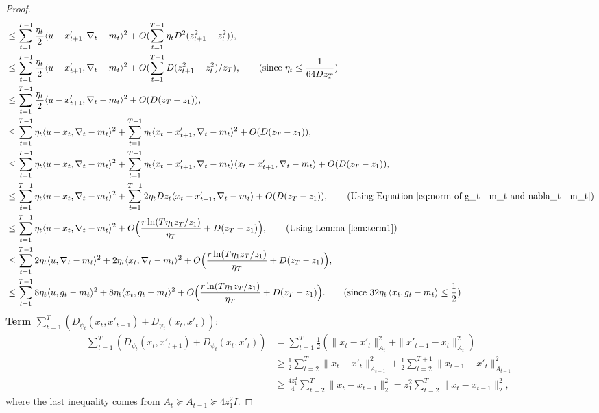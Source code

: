 \documentclass{article}
\theoremstyle{plain}
\theoremstyle{definition}
\theoremstyle{remark}
\newcommand{\inner}[2]{\left\langle #1, #2 \right\rangle}
\begin{document}
\begin{proof}
\begin{align*}
&\leq \sum_{t=1}^{T-1} \frac{\eta_t}{2}\langle u-x'_{t+1},\nabla_t-m_t\rangle^2+O(\sum_{t=1}^{T-1}\eta_t D^2(z_{t+1}^2-z_t^2)),\\
& \leq \sum_{t=1}^{T-1} \frac{\eta_t}{2}\langle u-x'_{t+1},\nabla_t-m_t\rangle^2+O(\sum_{t=1}^{T-1}D(z^2_{t+1}-z^2_t)/z_T), \qquad \text{(since 
 } \eta_t \leq \frac{1}{64 D z_T}\text{)}\\
&\leq \sum_{t=1}^{T-1} \frac{\eta_t}{2}\langle u-x'_{t+1},\nabla_t-m_t\rangle^2+O(D(z_T-z_1)),\\
& \leq \sum_{t=1}^{T-1} \eta_t\langle u-x_{t},\nabla_t-m_t\rangle^2+\sum_{t=1}^{T-1}\eta_t\langle x_{t}-x'_{t+1},\nabla_t-m_t\rangle^2+O(D(z_T-z_1)),\\
&\leq \sum_{t=1}^{T-1} \eta_t\langle u-x_{t},\nabla_t-m_t\rangle^2+\sum_{t=1}^{T-1}\eta_t\langle x_{t}-x'_{t+1},\nabla_t-m_t\rangle\langle x_{t}-x'_{t+1},\nabla_t-m_t\rangle+O(D(z_T-z_1)),\\
&\leq \sum_{t=1}^{T-1} \eta_t\langle u-x_{t},\nabla_t-m_t\rangle^2+\sum_{t=1}^{T-1}2\eta_tDz_t\langle x_{t}-x'_{t+1},\nabla_t-m_t\rangle+O(D(z_T-z_1)), \qquad \text{(Using Equation~\ref{eq:norm of g_t - m_t and nabla_t - m_t})}\\
&\leq \sum_{t=1}^{T-1} \eta_t\langle u-x_{t},\nabla_t-m_t\rangle^2+O\Big(\frac{r\ln(T\eta_1 z_T/z_1)}{\eta_T}+D(z_T-z_1)\Big),\qquad \text{(Using Lemma~\ref{lem:term1})}\\
&\leq \sum_{t=1}^{T-1} 2\eta_t\langle u,\nabla_t-m_t\rangle^2+2\eta_t\langle x_{t},\nabla_t-m_t\rangle^2+O\Big(\frac{r\ln(T\eta_1 z_T/z_1)}{\eta_T}+D(z_T-z_1)\Big),\\
&\leq \sum_{t=1}^{T-1} 8\eta_t\langle u,g_t-m_t\rangle^2+8\eta_t\langle x_{t},g_t-m_t\rangle^2+O\Big(\frac{r\ln(T\eta_1 z_T/z_1)}{\eta_T}+D(z_T-z_1)\Big). \qquad \text{(since $32\eta_t\inner{x_t}{g_t-m_t}\leq \frac{1}{2}$)}
\end{align*}
\textbf{Term $\sum_{t=1}^T(D_{\psi_t}(x_t,x'_{t+1})+D_{\psi_t}(x_t,x'_{t}))$}:
\begin{align*}
\sum_{t=1}^T(D_{\psi_t}(x_t,x'_{t+1})+D_{\psi_t}(x_t,x'_{t}))&=\sum_{t=1}^T\frac{1}{2}(\|x_t-x'_{t}\|_{A_t}^2+\|x'_{t+1}-x_t\|_{A_t}^2)\\
&\geq \frac{1}{2}\sum_{t=2}^T \|x_t-x'_{t}\|_{A_{t-1}}^2+\frac{1}{2}\sum_{t=2}^{T+1}\|x_{t-1}-x'_t\|_{A_{t-1}}^2\\
&\geq \frac{4z_1^2}{4}\sum_{t=2}^T\|x_t-x_{t-1}\|_2^2=z_1^2\sum_{t=2}^T\|x_t-x_{t-1}\|_2^2,
\end{align*}
where the last inequality comes from $A_t\succeq A_{t-1}\succeq 4z_1^2 I$.


\end{proof}
\end{document}
